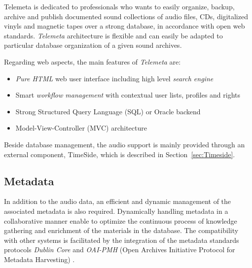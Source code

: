 \documentclass[runningheads,a4paper]{llncs}
\begin{document}
Telemeta is dedicated to professionals who wants to easily organize, backup, archive and publish documented sound collections of audio files, CDs, digitalized vinyls and magnetic tapes over a strong database, in accordance with open web standards. 
\emph{Telemeta} architecture is flexible and can easily be adapted to particular database organization of a given sound archives. 

Regarding web aspects, the main features of \emph{Telemeta} are:
\vspace{-0.1cm}
\begin{itemize}
\item \emph{Pure HTML} web user interface including high level \emph{search engine}
\item Smart \emph{workflow management} with contextual user lists, profiles and rights
\item Strong Structured Query Language (SQL) or Oracle backend
\item Model-View-Controller (MVC) architecture 
\end{itemize}
Beside database management, the audio support is mainly provided through an external component, TimeSide, which is described in Section~\ref{sec:Timeside}.

\subsection{Metadata}\label{sec:metadata}
In addition to the audio data, an efficient and dynamic management of the associated metadata is also required. %
Dynamically handling metadata in a collaborative manner enable to optimize the continuous process of knowledge gathering and enrichment of the materials in the database.  
The compatibility with other systems is facilitated by the integration of the metadata standards protocols \emph{Dublin Core} and \emph{OAI-PMH} (Open Archives Initiative Protocol for Metadata Harvesting) \cite{DublinCore,OAI-PMH}.
\vspace{-0.2cm}
\end{document}
